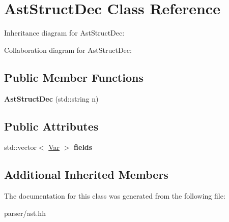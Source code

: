 \hypertarget{classAstStructDec}{}\section{Ast\+Struct\+Dec Class Reference}
\label{classAstStructDec}


Inheritance diagram for Ast\+Struct\+Dec\+:


Collaboration diagram for Ast\+Struct\+Dec\+:
\subsection*{Public Member Functions}
\begin{DoxyCompactItemize}
\item 
\mbox{\label{classAstStructDec_ab3a66ce5eccfd609f9da5d5bebece6ac}} 
{\bfseries Ast\+Struct\+Dec} (std\+::string n)
\end{DoxyCompactItemize}
\subsection*{Public Attributes}
\begin{DoxyCompactItemize}
\item 
\mbox{\label{classAstStructDec_ade16079002fd46a9e0d804341ffcf725}} 
std\+::vector$<$ \hyperlink{structVar}{Var} $>$ {\bfseries fields}
\end{DoxyCompactItemize}
\subsection*{Additional Inherited Members}


The documentation for this class was generated from the following file\+:\begin{DoxyCompactItemize}
\item 
parser/ast.\+hh\end{DoxyCompactItemize}
